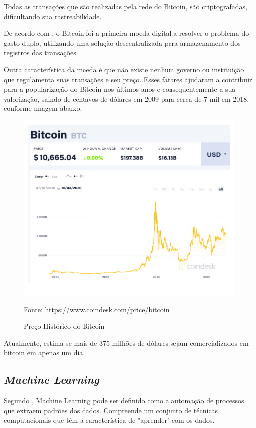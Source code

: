 \documentclass[12pt]{article}
\begin{document}
Todas as transações que são realizadas pela rede do Bitcoin, são criptografadas,
dificultando sua rastreabilidade.

De acordo com \cite{shawn:2017}, o Bitcoin foi a primeira moeda digital a 
resolver o problema do gasto duplo, utilizando uma solução descentralizada para 
armazenamento dos registros das transações.

Outra característica da moeda é que não existe nenhum governo ou instituição que
regulamenta suas transações e seu preço. Esses fatores ajudaram a contribuir 
para a popularização do Bitcoin nos últimos anos e consequentemente a sua 
valorização, saindo de centavos de dólares em 2009 para cerca de 7 mil em 2018, 
conforme imagem abaixo.

\begin{figure}[ht]
  \centering
  \includegraphics[scale=0.4]{img/btc-chart.png}
  \caption{Preço Histórico do Bitcoin}
  Fonte: https://www.coindesk.com/price/bitcoin
  \label{fig:btc-chart}
\end{figure}

Atualmente, estima-se mais de 375 milhões de dólares sejam comercializados em
bitcoin em apenas um dia.

\subsection{\textit{Machine Learning}}

Segundo \cite{kelleher2020fundamentals}, Machine Learning pode ser definido como 
a automação de processos que extraem padrões dos dados. Compreende um conjunto 
de técnicas computacionais que têm a característica de "aprender" com os dados.
\end{document}
